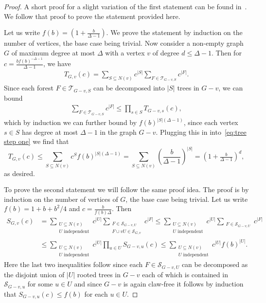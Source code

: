 \documentclass[a4paper,11pt,reqno]{amsart}
\numberwithin{equation}{section}
\begin{document}
\begin{proof}
A short proof for a slight variation of the first statement can be found in~\cite{PRsurvey}.
We follow that proof to prove the statement provided here.

Let us write $f(b)=\left(1+\tfrac{b}{\Delta-1}\right)$.
We prove the statement by induction on the number of vertices, the base case being trivial.
Now consider a non-empty graph $G$ of maximum degree at most $\Delta$ with a vertex $v$ of degree $d\leq \Delta-1$.
Then for $c=\tfrac{bf(b)^{-\Delta-1}}{\Delta-1}$, we have
\begin{align}\label{eq:tree step one}
    T_{G,v}(c)=\sum_{S\subseteq N(v)}c^{|S|}\sum_{F\in \mathcal{T}_{G-v,S}} c^{|F|}.
\end{align}
Since each forest $F\in \mathcal{T}_{G-v,S}$ can be decomposed into $|S|$ trees in $G-v$, we can bound
\begin{align*}
\sum_{F\in \mathcal{T}_{G-v,S}} c^{|F|}\leq \prod_{s\in S}T_{G-v,s}(c),    
\end{align*}
which by induction we can further bound by $f(b)^{|S|(\Delta-1)}$, since each vertex $s\in S$ has degree at most $\Delta-1$ in the graph $G-v$.
Plugging this in into~\eqref{eq:tree step one} we find that
\[
 T_{G,v}(c)\leq \sum_{S\subseteq N(v)}c^{S}f(b)^{|S|(\Delta-1)}=\sum_{S\subseteq N(v)} \left(\frac{b}{\Delta-1}\right)^{|S|}=\left(1+\tfrac{b}{\Delta-1}\right)^{d},
\]
as desired.

To prove the second statement we will follow the same proof idea.
The proof is by induction on the number of vertices of $G$, the base case being trivial.
Let us write $f(b)=1+b+b^2/4$ and $c=\tfrac{b}{f(b)\Delta}$.
Then 
\begin{align*}
    S_{G,v}(c)&=\sum_{\substack{U\subseteq N(v)\\U\text{ independent}}}c^{|U|}\sum_{\substack{F\in \mathcal{S}_{G-v,U}\\ F\cup vU\in \mathcal{S}_{G,v}}} c^{|F|}
    \leq \sum_{\substack{U\subseteq N(v)\\U\text{ independent}}}c^{|U|}\sum_{\substack{F\in \mathcal{S}_{G-v,U}}} c^{|F|}
    \\
    &\leq \sum_{\substack{U\subseteq N(v)\\U\text{ independent}}}c^{|U|}\prod_{u\in U}S_{G-v,u}(c)\leq \sum_{\substack{U\subseteq N(v)\\U\text{ independent}}}c^{|U|}f(b)^{|U|}.
\end{align*}
Here the last two inequalities follow since each $F\in \mathcal{S}_{G-v,U}$ can be decomposed as the disjoint union of $|U|$ rooted trees in $G-v$ each of which is contained in $\mathcal{S}_{G-v,u}$ for some $u\in U$ and since $G-v$ is again claw-free it follows by induction that $S_{G-v,u}(c)\leq f(b)$ for each $u\in U$.


\end{proof}
\end{document}
